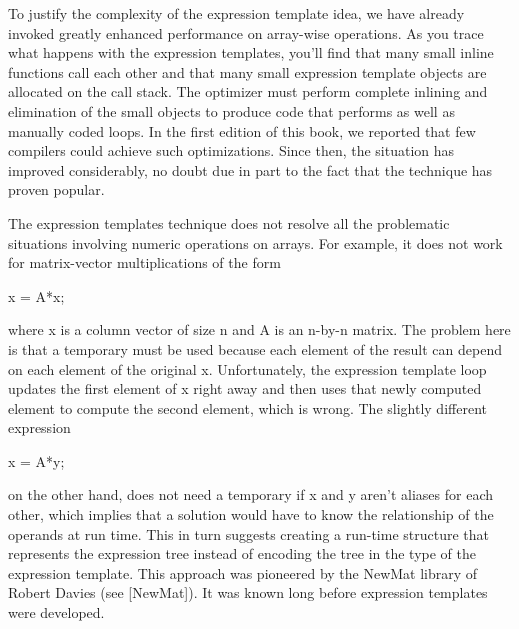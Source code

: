To justify the complexity of the expression template idea, we have already invoked greatly enhanced performance on array-wise operations. As you trace what happens with the expression templates, you’ll find that many small inline functions call each other and that many small expression template objects are allocated on the call stack. The optimizer must perform complete inlining and elimination of the small objects to produce code that performs as well as manually coded loops. In the first edition of this book, we reported that few compilers could achieve such optimizations. Since then, the situation has improved considerably, no doubt due in part to the fact that the technique has proven popular.

The expression templates technique does not resolve all the problematic situations involving numeric operations on arrays. For example, it does not work for matrix-vector multiplications of the form

x = A*x;

where x is a column vector of size n and A is an n-by-n matrix. The problem here is that a temporary must be used because each element of the result can depend on each element of the original x. Unfortunately, the expression template loop updates the first element of x right away and then uses that newly computed element to compute the second element, which is wrong. The slightly different expression

x = A*y;

on the other hand, does not need a temporary if x and y aren’t aliases for each other, which implies that a solution would have to know the relationship of the operands at run time. This in turn suggests creating a run-time structure that represents the expression tree instead of encoding the tree in the type of the expression template. This approach was pioneered by the NewMat library of Robert Davies (see [NewMat]). It was known long before expression templates were developed.

















































